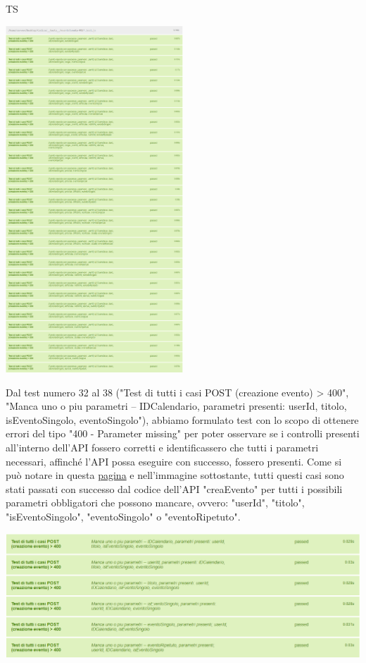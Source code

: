 \begin{listaPersonale}{TS}
\begin{center}
                        \includegraphics[width=0.5\textwidth, height=0.6\textheight]{img/png/tests/EventoPost/200_PostEvento.png}
                \end{center}
                Dal test numero 32 al 38 ("Test di tutti i casi POST (creazione evento) > 400", "Manca uno o piu parametri -- IDCalendario, parametri presenti: userId, titolo, isEventoSingolo, eventoSingolo"), abbiamo formulato test con lo scopo di ottenere errori del tipo "400 - Parameter missing" per poter osservare se i controlli presenti all'interno dell'API fossero corretti e identificassero che tutti i parametri necessari, affinché l'API possa eseguire con successo, fossero presenti. Come si può notare in questa \href{https://plan-it.it/test-report.html} {pagina} e nell'immagine sottostante, tutti questi casi sono stati passati con successo dal codice dell'API "creaEvento" per tutti i possibili parametri obbligatori che possono mancare, ovvero: "userId", "titolo", "isEventoSingolo", "eventoSingolo" o "eventoRipetuto".
                \begin{center}
                        \includegraphics[width=1\textwidth, height=0.25\textheight]{img/png/tests/EventoPost/400_missingParameter_PostEvento.png}

\end{center}
\end{listaPersonale}
